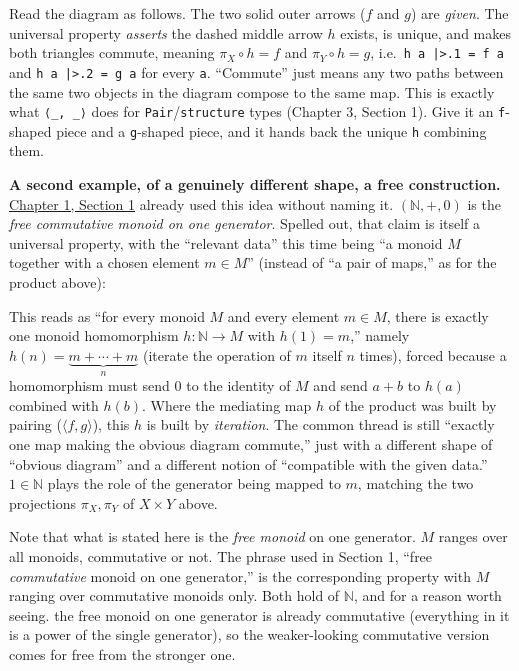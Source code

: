 Read the diagram as follows. The two solid outer arrows (\(f\) and \(g\)) are \emph{given}. The universal property \emph{asserts} the dashed middle arrow \(h\) exists, is unique, and makes both triangles commute, meaning \(\pi_X \circ h = f\) and \(\pi_Y \circ h = g\), i.e.~\texttt{h a |>.1 = f a} and \texttt{h a |>.2 = g a} for every \texttt{a}. ``Commute'' just means any two paths between the same two objects in the diagram compose to the same map. This is exactly what \texttt{⟨\_\allowbreak{}, \_\allowbreak{}⟩} does for \texttt{Pair}/\texttt{structure} types (Chapter 3, Section 1). Give it an \texttt{f}-shaped piece and a \texttt{g}-shaped piece, and it hands back the unique \texttt{h} combining them.

\textbf{A second example, of a genuinely different shape, a free construction.} \hyperref[sec:01-basics:01-everything-has-a-type:1]{Chapter 1, Section 1} already used this idea without naming it. \((\mathbb{N}, +, 0)\) is the \emph{free commutative monoid on one generator}. Spelled out, that claim is itself a universal property, with the ``relevant data'' this time being ``a monoid \(M\) together with a chosen element \(m \in M\)'' (instead of ``a pair of maps,'' as for the product above):

\begin{center}

\end{center}

This reads as ``for every monoid \(M\) and every element \(m \in M\), there is exactly one monoid homomorphism \(h : \mathbb{N} \to M\) with \(h(1) = m\),'' namely \(h(n) = \underbrace{m + \cdots + m}_{n}\) (iterate the operation of \(m\) itself \(n\) times), forced because a homomorphism must send \(0\) to the identity of \(M\) and send \(a+b\) to \(h(a)\) combined with \(h(b)\). Where the mediating map \(h\) of the product was built by pairing (\(\langle f, g\rangle\)), this \(h\) is built by \emph{iteration}. The common thread is still ``exactly one map making the obvious diagram commute,'' just with a different shape of ``obvious diagram'' and a different notion of ``compatible with the given data.'' \(1 \in \mathbb{N}\) plays the role of the generator being mapped to \(m\), matching the two projections \(\pi_X,\pi_Y\) of \(X\times Y\) above.

Note that what is stated here is the \emph{free monoid} on one generator. \(M\) ranges over all monoids, commutative or not. The phrase used in Section 1, ``free \emph{commutative} monoid on one generator,'' is the corresponding property with \(M\) ranging over commutative monoids only. Both hold of \(\mathbb{N}\), and for a reason worth seeing. the free monoid on one generator is already commutative (everything in it is a power of the single generator), so the weaker-looking commutative version comes for free from the stronger one.

